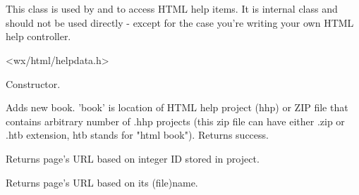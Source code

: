 %
%

\section{}\label{wxhtmlhelpdata}

This class is used by  
and  to access HTML help items.
It is internal class and should not be used directly - except for the case 
you're writing your own HTML help controller.




<wx/html/helpdata.h>


\label{wxhtmlhelpdatawxhtmlhelpdata}


Constructor.

\label{wxhtmlhelpdataaddbook}


Adds new book. 'book' is location of HTML help project (hhp) or ZIP file
that contains arbitrary number of .hhp projects (this zip file can have
either .zip or .htb extension, htb stands for "html book").
Returns success.

\label{wxhtmlhelpdatafindpagebyid}


Returns page's URL based on integer ID stored in project.

\label{wxhtmlhelpdatafindpagebyname}


Returns page's URL based on its (file)name.

\label{wxhtmlhelpdatagetbookrecarray}


